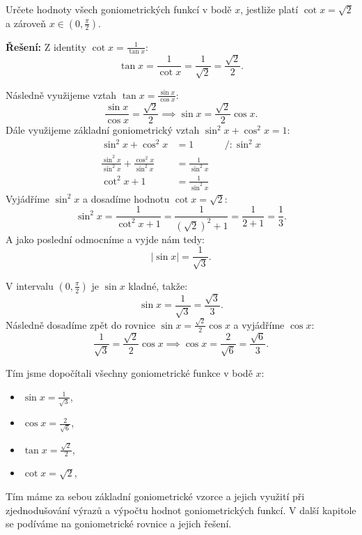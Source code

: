 \documentclass[12pt,a4paper]{article}
\begin{document}
\begin{examplebox}
    Určete hodnoty všech goniometrických funkcí v bodě $x$, jestliže platí $\cot x = \sqrt{2}$
    a zároveň $x \in \left(0, \frac{\pi}{2}\right)$.

    \medskip
    \textbf{Řešení:}
    Z identity $\cot x = \frac{1}{\tan x}$:
    \[
    \tan x = \frac{1}{\cot x} = \frac{1}{\sqrt{2}} = \frac{\sqrt{2}}{2}.
    \]

    Následně využijeme vztah $\tan x = \frac{\sin x}{\cos x}$:
    \[
    \frac{\sin x}{\cos x} = \frac{\sqrt{2}}{2} \implies \sin x = \frac{\sqrt{2}}{2} \cos x.
    \]
    Dále využijeme základní goniometrický vztah $\sin^2 x + \cos^2 x = 1$:
    \[
    \begin{aligned}
        \sin^2 x + \cos^2 x &= 1 && \big/ : \sin^2 x \\[0.5em]
        \frac{\sin^2 x}{\sin^2 x} + \frac{\cos^2 x}{\sin^2 x} &= \frac{1}{\sin^2 x} \\[0.5em]
        \cot^2 x + 1 &= \frac{1}{\sin^2 x}
    \end{aligned}
    \]
    Vyjádříme $\sin^2 x$ a dosadíme hodnotu $\cot x = \sqrt{2}$:
    \[
    \sin^2 x = \frac{1}{\cot^2 x + 1} = \frac{1}{(\sqrt{2})^2 + 1} = \frac{1}{2 + 1} = \frac{1}{3}.
    \]
    A jako poslední odmocníme a vyjde nám tedy:
    \[
    |\sin x| = \frac{1}{\sqrt{3}}.
    \]

    V intervalu $\left(0, \frac{\pi}{2}\right)$ je $\sin x$ kladné, takže:
    \[
    \sin x = \frac{1}{\sqrt{3}} = \frac{\sqrt{3}}{3}.
    \]
    Následně dosadíme zpět do rovnice $\sin x = \frac{\sqrt{2}}{2} \cos x$ a vyjádříme $\cos x$:
    \[
    \frac{1}{\sqrt{3}} = \frac{\sqrt{2}}{2} \cos x \implies \cos x = \frac{2}{\sqrt{6}} = \frac{\sqrt{6}}{3}.
    \]
    
    \medskip
    Tím jsme dopočítali všechny goniometrické funkce v bodě $x$:
    \begin{itemize}
        \item $\sin x = \frac{1}{\sqrt{3}}$,
        \item $\cos x = \frac{2}{\sqrt{6}}$,
        \item $\tan x = \frac{\sqrt{2}}{2}$,
        \item $\cot x = \sqrt{2}$,
    \end{itemize}
\end{examplebox}

Tím máme za sebou základní goniometrické vzorce a jejich využití při zjednodušování výrazů
a výpočtu hodnot goniometrických funkcí. V další kapitole se podíváme na goniometrické rovnice
a jejich řešení.
\end{document}
